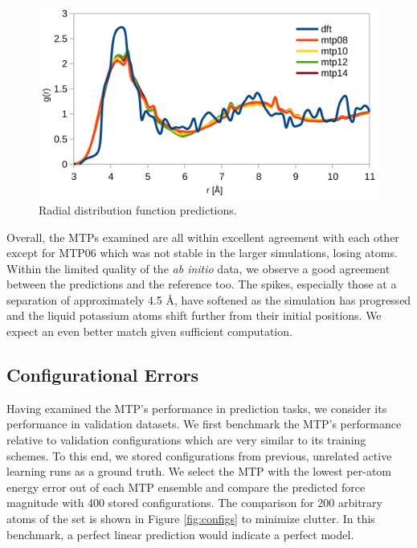 \documentclass[9pt,twocolumn,twoside]{opticajnl}
\begin{document}
\begin{figure}[ht]
  \centering
  \includegraphics[width=\linewidth]{assets/rdf.png}
  \caption{Radial distribution function predictions.}
  \label{fig:rdf}
\end{figure}

Overall, the MTPs examined are all within excellent agreement with each other except for MTP06 which was not stable in the larger simulations, losing atoms. Within the limited quality of the \textit{ab initio} data, we observe a good agreement between the predictions and the reference too. The spikes, especially those at a separation of approximately 4.5 Å, have softened as the simulation has progressed and the liquid potassium atoms shift further from their initial positions. We expect an even better match given sufficient computation.

\subsection{Configurational Errors}
Having examined the MTP's performance in prediction tasks, we consider its performance in validation datasets. We first benchmark the MTP's performance relative to validation configurations which are very similar to its training schemes. To this end, we stored configurations from previous, unrelated active learning runs as a ground truth. We select the MTP with the lowest per-atom energy error out of each MTP ensemble and compare the predicted force magnitude with 400 stored configurations. The comparison for 200 arbitrary atoms of the set is shown in Figure \ref{fig:configs} to minimize clutter. In this benchmark, a perfect linear prediction would indicate a perfect model.
\end{document}
